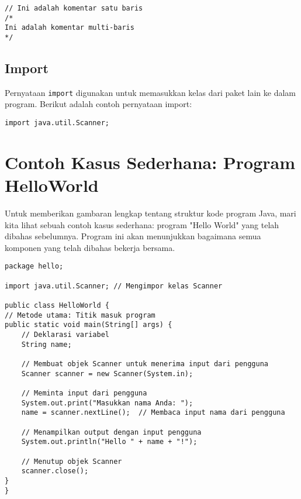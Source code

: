 \begin{lstlisting}[style=JavaStyle]
// Ini adalah komentar satu baris
/*
Ini adalah komentar multi-baris
*/
\end{lstlisting}

\subsection{Import}

Pernyataan \texttt{import} digunakan untuk memasukkan kelas dari paket lain ke dalam program. Berikut adalah contoh pernyataan import:

\begin{lstlisting}[style=JavaStyle]
import java.util.Scanner;
\end{lstlisting}

\section{Contoh Kasus Sederhana: Program HelloWorld}

Untuk memberikan gambaran lengkap tentang struktur kode program Java, mari kita lihat sebuah contoh kasus sederhana: program "Hello World" yang telah dibahas sebelumnya. Program ini akan menunjukkan bagaimana semua komponen yang telah dibahas bekerja bersama.

\begin{lstlisting}[style=JavaStyle, caption={Contoh Program HelloWorld.java}]
package hello;

import java.util.Scanner; // Mengimpor kelas Scanner

public class HelloWorld {
// Metode utama: Titik masuk program
public static void main(String[] args) {
	// Deklarasi variabel
	String name;
	
	// Membuat objek Scanner untuk menerima input dari pengguna
	Scanner scanner = new Scanner(System.in);
	
	// Meminta input dari pengguna
	System.out.print("Masukkan nama Anda: ");
	name = scanner.nextLine();  // Membaca input nama dari pengguna
	
	// Menampilkan output dengan input pengguna
	System.out.println("Hello " + name + "!");
	
	// Menutup objek Scanner
	scanner.close();
}
}
\end{lstlisting}



